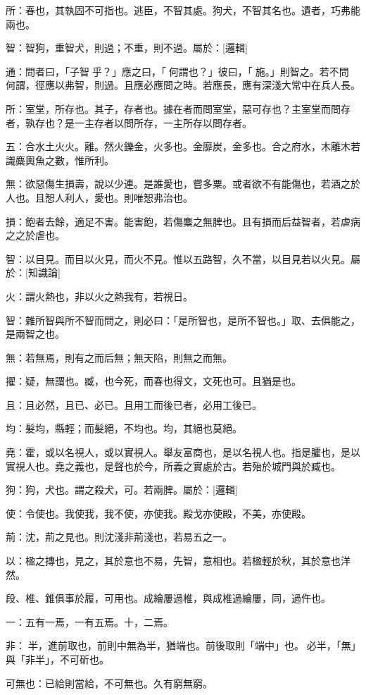 \begin{pinyinscope}
所：春也，其執固不可指也。逃臣，不智其處。狗犬，不智其名也。遺者，巧弗能兩也。

智：智狗，重智犬，則過；不重，則不過。屬於：[邏輯]

通：問者曰，「子智𩥡乎？」應之曰，「𩥡何謂也？」彼曰，「𩥡施。」則智之。若不問𩥡何謂，徑應以弗智，則過。且應必應問之時。若應長，應有深淺大常中在兵人長。

所：室堂，所存也。其子，存者也。據在者而問室堂，惡可存也？主室堂而問存者，孰存也？是一主存者以問所存，一主所存以問存者。

五：合水土火火。離。然火鑠金，火多也。金靡炭，金多也。合之府水，木離木若識麋輿魚之數，惟所利。

無：欲惡傷生損壽，說以少連。是誰愛也，嘗多粟。或者欲不有能傷也，若酒之於人也。且𢜔人利人，愛也。則唯𢜔弗治也。

損：飽者去餘，適足不害。能害飽，若傷麋之無脾也。且有損而后益智者，若虐病之之於虐也。

智：以目見。而目以火見，而火不見。惟以五路智，久不當，以目見若以火見。屬於：[知識論]

火：謂火熱也，非以火之熱我有，若視日。

智：雜所智與所不智而問之，則必曰：「是所智也，是所不智也。」取、去俱能之，是兩智之也。

無：若無焉，則有之而后無；無天陷，則無之而無。

擢：疑，無謂也。臧，也今死，而春也得文，文死也可。且猶是也。

且：且必然，且已、必已。且用工而後已者，必用工後已。

均：髮均，縣輕；而髮絕，不均也。均，其絕也莫絕。

堯：霍，或以名視人，或以實視人。舉友富商也，是以名視人也。指是臛也，是以實視人也。堯之義也，是聲也於今，所義之實處於古。若殆於城門與於臧也。

狗：狗，犬也。謂之殺犬，可。若兩脾。屬於：[邏輯]

使：令使也。我使我，我不使，亦使我。殿戈亦使殿，不美，亦使殿。

荊：沈，荊之見也。則沈淺非荊淺也，若易五之一。

以：楹之摶也，見之，其於意也不易，先智，意相也。若楹輕於秋，其於意也洋然。

段、椎、錐俱事於履，可用也。成繪屢過椎，與成椎過繪屢，同，過仵也。

一：五有一焉，一有五焉。十，二焉。

非：𣃈半，進前取也，前則中無為半，猶端也。前後取則「端中」也。𣃈必半，「無」與「非半」，不可斫也。

可無也：已給則當給，不可無也。久有窮無窮。


\end{pinyinscope}
